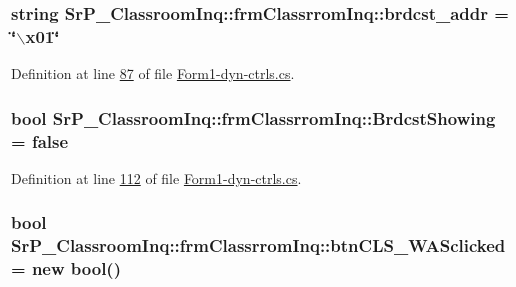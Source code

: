 \hypertarget{class_sr_p___classroom_inq_1_1frm_classrrom_inq_a1d96e40e37aca536a94b7107df4a2d71}{
\subsubsection[{brdcst\-\_\-addr}]{\setlength{\rightskip}{0pt plus 5cm}string {\bf \-Sr\-P\-\_\-\-Classroom\-Inq\-::frm\-Classrrom\-Inq\-::brdcst\-\_\-addr} = \char`\"{}$\backslash$x01\char`\"{}}}
\label{class_sr_p___classroom_inq_1_1frm_classrrom_inq_a1d96e40e37aca536a94b7107df4a2d71}


\-Definition at line \hyperlink{_form1-dyn-ctrls_8cs_source_l00087}{87} of file \hyperlink{_form1-dyn-ctrls_8cs_source}{\-Form1-\/dyn-\/ctrls.\-cs}.

\hypertarget{class_sr_p___classroom_inq_1_1frm_classrrom_inq_a03327a44c502ac413d982a79dce5483c}{
\subsubsection[{\-Brdcst\-Showing}]{\setlength{\rightskip}{0pt plus 5cm}bool {\bf \-Sr\-P\-\_\-\-Classroom\-Inq\-::frm\-Classrrom\-Inq\-::\-Brdcst\-Showing} = false}}
\label{class_sr_p___classroom_inq_1_1frm_classrrom_inq_a03327a44c502ac413d982a79dce5483c}


\-Definition at line \hyperlink{_form1-dyn-ctrls_8cs_source_l00112}{112} of file \hyperlink{_form1-dyn-ctrls_8cs_source}{\-Form1-\/dyn-\/ctrls.\-cs}.

\hypertarget{class_sr_p___classroom_inq_1_1frm_classrrom_inq_aed9d1ad7c4e2b196997c1820ac2cdb4d}{
\subsubsection[{btn\-C\-L\-S\-\_\-\-W\-A\-Sclicked}]{\setlength{\rightskip}{0pt plus 5cm}bool {\bf \-Sr\-P\-\_\-\-Classroom\-Inq\-::frm\-Classrrom\-Inq\-::btn\-C\-L\-S\-\_\-\-W\-A\-Sclicked} = new bool()}}
\label{class_sr_p___classroom_inq_1_1frm_classrrom_inq_aed9d1ad7c4e2b196997c1820ac2cdb4d}


